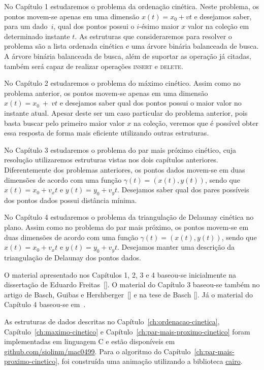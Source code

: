 No Capítulo 1 estudaremos o problema da ordenação cinética.
Neste problema, os pontos movem-se apenas em uma dimensão $x(t) = x_0 + vt$ e
desejamos saber, para um dado~$i$, qual dos pontos possui o $i$-ésimo maior $x$ valor na coleção em
determinado instante $t$.
As estruturas que consideraremos para resolver o problema são a lista
ordenada cinética e uma árvore binária balanceada de busca.
A árvore binária balanceada de busca, além de suportar as operação já citadas,
também será capaz de realizar operações \textsc{insert} e \textsc{delete}.

No Capítulo 2 estudaremos o problema do máximo cinético.
Assim como no problema anterior, os pontos movem-se apenas em uma
dimensão $x(t) = x_0~+~vt$ e desejamos saber qual dos pontos possui o maior valor
no instante atual.
Apesar deste ser um caso particular do problema anterior, pois basta buscar pelo primeiro
maior valor $x$ na coleção, veremos que é possível obter essa resposta de forma mais
eficiente utilizando outras estruturas.

No Capítulo 3 estudaremos o problema do par mais próximo cinético, cuja resolução
utilizaremos estruturas vistas nos dois capítulos anteriores.
Diferentemente dos problemas anteriores, os pontos dados movem-se em duas dimensões
de acordo com uma função $\gamma(t) = (x(t), y(t))$, sendo que $x(t) = x_0 + v_x t$ e
$y(t) = y_0 + v_y t$.
Desejamos saber qual dos pares possíveis dos pontos dados possui distância mínima.

No Capítulo 4 estudaremos o problema da triangulação de Delaunay cinética no plano.
Assim como no problema do par mais próximo, os pontos movem-se em duas dimensões de acordo com uma
função $\gamma(t) = (x(t), y(t))$, sendo que $x(t) = x_0 + v_x t$ e $y(t) = y_0 + v_y t$.
Desejamos manter uma descrição da triangulação de Delaunay dos pontos dados.

O material apresentado nos Capítulos 1, 2, 3 e 4 baseou-se inicialmente na dissertação de Eduardo
Freitas~[\cite{eduardo}].
O material do Capítulo 3 baseou-se também no artigo de Basch, Guibas e
Hershberger~[\cite{BASCH19991}] e na tese de Basch [\cite{basch-thesis}].
Já o material do Capítulo 4 baseou-se em~\cite{computationalgeometry}.

As estruturas de dados descritas no Capítulo~\ref{ch:ordenacao-cinetica},
Capítulo~\ref{ch:maximo-cinetico} e Capítulo~\ref{ch:par-mais-proximo-cinetico} foram implementadas
em linguagem C e estão disponíveis em \href{https://github
.com/siolinm/mac0499/tree/main/implementacao}{github.com/siolinm/mac0499}.
Para o algoritmo do Capítulo~\ref{ch:par-mais-proximo-cinetico}, foi construída uma animação
utilizando a biblioteca \href{https://www.cairographics.org/}{cairo}.
